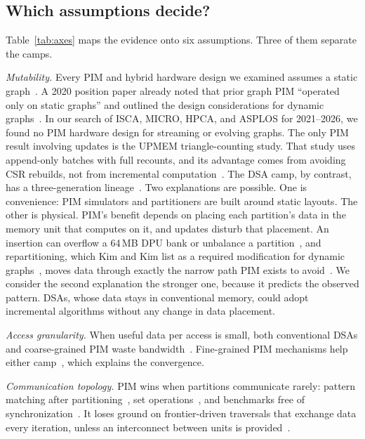 \documentclass[journal,onecolumn]{IEEEtran}
\begin{document}
\subsection{Which assumptions decide?}
Table~\ref{tab:axes} maps the evidence onto six assumptions. Three of them separate the camps.

\emph{Mutability.} Every PIM and hybrid hardware design we examined assumes a static graph~\cite{ahn2015tesseract,zhang2018graphp,zhuo2019graphq,song2018graphr,shin2025piccolo,shin2025fala,yenimol2026cograf}. A 2020 position paper already noted that prior graph PIM ``operated only on static graphs'' and outlined the design considerations for dynamic graphs~\cite{kim2020dynamic}. In our search of ISCA, MICRO, HPCA, and ASPLOS for 2021--2026, we found no PIM hardware design for streaming or evolving graphs. The only PIM result involving updates is the UPMEM triangle-counting study. That study uses append-only batches with full recounts, and its advantage comes from avoiding CSR rebuilds, not from incremental computation~\cite{asquini2025tc}. The DSA camp, by contrast, has a three-generation lineage~\cite{rahman2021jetstream,zhao2022tdgraph,gao2023mega}. Two explanations are possible. One is convenience: PIM simulators and partitioners are built around static layouts. The other is physical. PIM's benefit depends on placing each partition's data in the memory unit that computes on it, and updates disturb that placement. An insertion can overflow a 64\,MB DPU bank or unbalance a partition~\cite{cai2024pimpam}, and repartitioning, which Kim and Kim list as a required modification for dynamic graphs~\cite{kim2020dynamic}, moves data through exactly the narrow path PIM exists to avoid~\cite{gomezluna2022prim}. We consider the second explanation the stronger one, because it predicts the observed pattern. DSAs, whose data stays in conventional memory, could adopt incremental algorithms without any change in data placement.

\emph{Access granularity.} When useful data per access is small, both conventional DSAs and coarse-grained PIM waste bandwidth~\cite{shin2025piccolo}. Fine-grained PIM mechanisms help either camp~\cite{shin2025fala,yenimol2026cograf}, which explains the convergence.

\emph{Communication topology.} PIM wins when partitions communicate rarely: pattern matching after partitioning~\cite{cai2024pimpam}, set operations~\cite{besta2021sisa}, and benchmarks free of synchronization~\cite{gomezluna2022prim}. It loses ground on frontier-driven traversals that exchange data every iteration, unless an interconnect between units is provided~\cite{zhuo2019graphq,barkhordar2025alphapim}.
\end{document}
